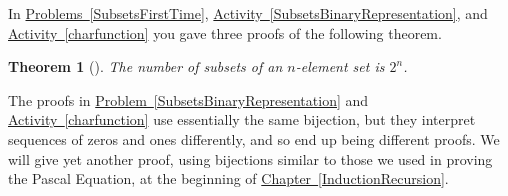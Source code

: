 \documentclass[10pt,]{book}
\theoremstyle{plain}
\newtheorem{theorem}{Theorem}[section]
\theoremstyle{definition}
\numberwithin{equation}{chapter}
\begin{document}
In \hyperref[SubsetsFirstTime]{Problems~\ref{SubsetsFirstTime}}, \hyperref[SubsetsBinaryRepresentation]{Activity~\ref{SubsetsBinaryRepresentation}}, and \hyperref[charfunction]{Activity~\ref{charfunction}} you gave three proofs of the following theorem.%
\begin{theorem}[{}]\label{theorem-1}
The number of subsets of an \(n\)-element set is \(2^n\).%
\end{theorem}
The proofs in \hyperref[SubsetsBinaryRepresentation]{Problem~\ref{SubsetsBinaryRepresentation}} and \hyperref[charfunction]{Activity~\ref{charfunction}} use essentially the same bijection, but they interpret sequences of zeros and ones differently, and so end up being different proofs. We will give yet another proof, using bijections similar to those we used in proving the Pascal Equation, at the beginning of \hyperref[InductionRecursion]{Chapter~\ref{InductionRecursion}}.%
\typeout{************************************************}
\typeout{************************************************}
\end{document}
